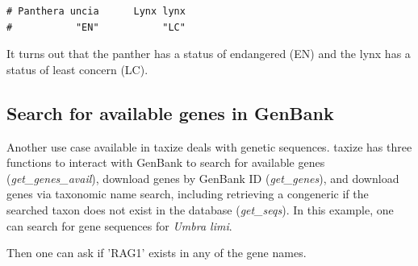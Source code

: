 \begin{sloppypar}
\begin{knitrout}\small
{}
\color{fgcolor}
\begin{kframe}
\begin{alltt}
 \hlkwb{<-} \hlstd{(}\hlstd{(}\hlstd{,} \hlstd{))}
\end{alltt}
\begin{verbatim}
# Panthera uncia      Lynx lynx 
#           "EN"           "LC"
\end{verbatim}
\end{kframe}
\end{knitrout}

It turns out that the panther has a status of endangered (EN) and the lynx has a status of least concern (LC).


\subsection{Search for available genes in GenBank}
Another use case available in taxize deals with genetic sequences. 
taxize has three functions to interact with GenBank to search for available genes \\ (\emph{get\_genes\_avail}), download genes by GenBank ID (\emph{get\_genes}), and download genes via taxonomic name search, including retrieving a congeneric if the searched taxon does not exist in the database (\emph{get\_seqs}). 
In this example, one can search for gene sequences for \emph{Umbra limi}.

\begin{knitrout}\small
{}
\color{fgcolor}\begin{kframe}
\begin{alltt}
 \hlkwb{<-} \hlstd{(} \hlstd{=} \hlstd{,}
                        \hlstd{=} \hlstd{,}
                        \hlstd{=} \hlstd{)}
\end{alltt}
\end{kframe}
\end{knitrout}


Then one can ask if 'RAG1' exists in any of the gene names.


\end{sloppypar}
